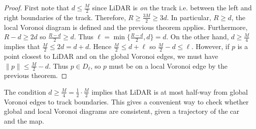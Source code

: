 \begin{proof}
First note that $d \leq \frac{M}{2}$ since LiDAR is \emph{on} the track i.e. between the left and right boundaries of the track.
%
Therefore, $R \geq \frac{3M}{2} \geq 3d$.
%
In particular, $R \geq d$, the local Voronoi diagram is defined and the previous theorem applies.
%
Furthermore,
$R-d \geq 2d$ so $\frac{R-d}{2} \geq d$.
%
Thus $\ell = \min \{ \frac{R-d}{2}, d \} = d$.
%
On the other hand, $d \geq \frac{M}{4}$ implies that $\frac{M}{2} \leq 2d = d + d$.
%
Hence $\frac{M}{2} \leq d + \ell $ so $\frac{M}{2} - d \leq \ell $.
%
However, if $p$ is a point closest to LiDAR and on the global Voronoi edges, we must have $\lVert p \rVert \leq \frac{M}{2} - d$.
%
Thus $p \in D_\ell$, so $p$ must be on a local Voronoi edge by the previous theorem.
\end{proof}

The condition $d \geq \frac{M}{4} = \frac{1}{2} \cdot \frac{M}{2}$ implies that LiDAR is at most half-way from global Voronoi edges to track boundaries.
%
This gives a convenient way to check whether global and local Voronoi diagrams are consistent, given a trajectory of the car and the map.